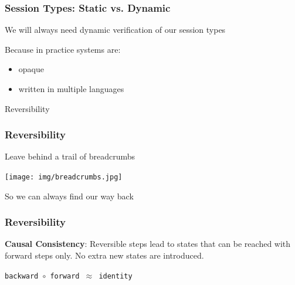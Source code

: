 \documentclass[12pt]{beamer}
\begin{document}
\begin{frame}
\frametitle{Session Types: Static vs. Dynamic}
\begin{center}

    \Large{We will always need dynamic verification of our session types}

\end{center}
Because in practice systems are: 


\begin{itemize}
    \item opaque
    \item written in multiple languages
\end{itemize}

\end{frame}


\begin{frame}
\begin{center}
    \LARGE{Reversibility} 
\end{center}
\end{frame}



\begin{frame}
\frametitle{Reversibility}


\begin{center}
    \Large{Leave behind a trail of breadcrumbs} 
    \begin{center}
        \texttt{[image: img/breadcrumbs.jpg]}
    \end{center}
So we can always find our way back
\end{center}
\end{frame}


\begin{frame}
\frametitle{Reversibility}

\textbf{Causal Consistency}: Reversible steps lead to states that can be reached with forward steps only. No extra new states are introduced.

\begin{center}
    \Large{\texttt{backward $\circ$ forward $\approx$ identity}}
\end{center}




\end{frame}
\end{document}
